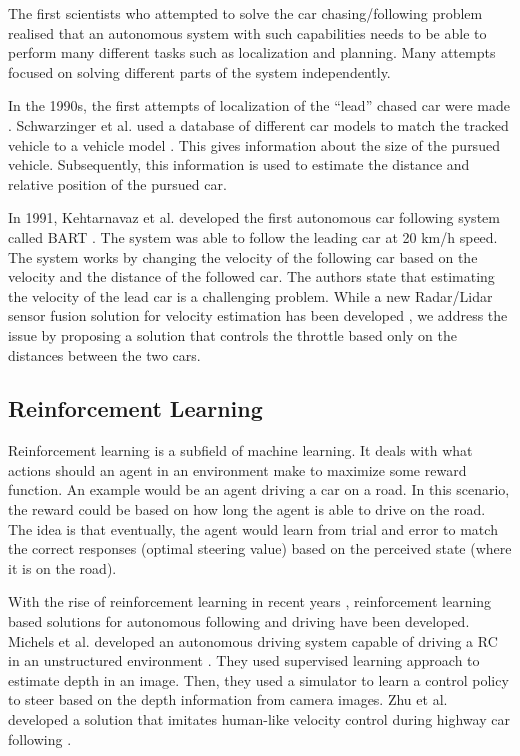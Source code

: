 \documentclass{ctuthesis/ctuthesis}
\begin{document}
The first scientists who attempted to solve the car chasing/following problem realised that an autonomous system with such capabilities needs to be able to perform many different tasks such as localization and planning. Many attempts focused on solving different parts of the system independently.\par

In the 1990s, the first attempts of localization of the ``lead'' chased car were made \cite{only_detection_and_tracking,also_only_car_tracking,night}. Schwarzinger et al. used a database of different car models to match the tracked vehicle to a vehicle model \cite{only_detection_and_tracking}. This gives information about the size of the pursued vehicle. Subsequently, this information is used to estimate the distance and relative position of the pursued car.


In 1991, Kehtarnavaz et al. developed the first autonomous car following system called BART \cite{BART_car_following}. The system was able to follow the leading car at 20 km/h speed. The system works by changing the velocity of the following car based on the velocity and the distance of the followed car. The authors state that estimating the velocity of the lead car is a challenging problem. While a new Radar/Lidar sensor fusion solution for velocity estimation has been developed \cite{lidar_highway}, we address the issue by proposing a solution that controls the throttle based only on the distances between the two cars.


\subsection{Reinforcement Learning}
Reinforcement learning is a subfield of machine learning. It deals with what actions should an agent in an environment make to maximize some reward function. An example would be an agent driving a car on a road. In this scenario, the reward could be based on how long the agent is able to drive on the road. The idea is that eventually, the agent would learn from trial and error to match the correct responses (optimal steering value) based on the perceived state (where it is on the road).\par

With the rise of reinforcement learning in recent years \cite{alphago,deepstack,alphastar}, reinforcement learning based solutions for autonomous following and driving have been developed. Michels et al. developed an autonomous driving system capable of driving a RC in an unstructured environment \cite{RL_autonomous_driving}. They used supervised learning approach to estimate depth in an image. Then, they used a simulator to learn a control policy to steer based on the depth information from camera images. Zhu et al. developed a solution that imitates human-like velocity control during highway car following \cite{RL_humanlike,RL_velocity}.\par
\end{document}
